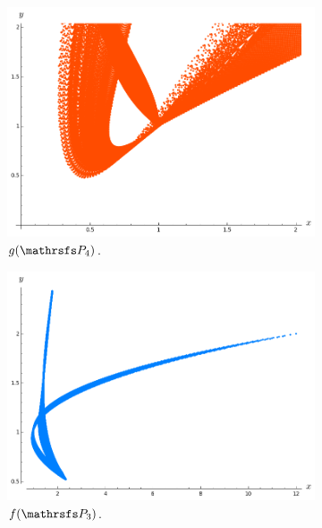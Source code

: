\documentclass{beamer}
\begin{document}
\begin{frame}
\begin{figure}
\vspace{-0.25cm}
\begin{subfigure}{.32\linewidth}\centering
\includegraphics[width=1\textwidth]{plots/ch5_08_P4prime.png}
\caption{$g(\PP_4)$.}
\end{subfigure}
\begin{subfigure}{.32\linewidth}\centering
\includegraphics[width=1\textwidth]{plots/ch5_05_P3.png}
\caption{$f(\PP_3)$.}
\end{subfigure}
\begin{subfigure}{.32\linewidth}\centering

\end{subfigure}
\end{figure}
\end{frame}
\end{document}
